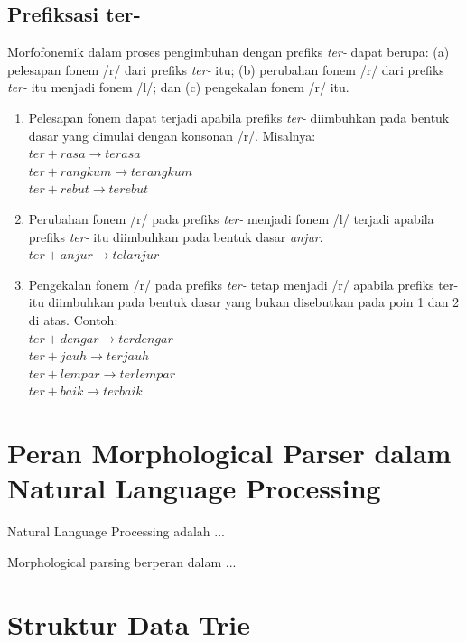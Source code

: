 \subsection{Prefiksasi ter-}
\label{sec:prefiksasiTer-}

Morfofonemik dalam proses pengimbuhan dengan prefiks \textit{ter-} dapat berupa: (a) pelesapan fonem /r/ dari prefiks \textit{ter-} itu; (b) perubahan fonem /r/ dari prefiks \textit{ter-} itu menjadi fonem /l/; dan (c) pengekalan fonem /r/ itu. 

\begin{enumerate}
	\item Pelesapan fonem dapat terjadi apabila prefiks \textit{ter-} diimbuhkan pada bentuk dasar yang dimulai dengan konsonan /r/. Misalnya:\\
	$ter + rasa \rightarrow terasa$\\
	$ter + rangkum \rightarrow terangkum$\\
	$ter + rebut \rightarrow terebut$
	
	\item Perubahan fonem /r/ pada prefiks \textit{ter-} menjadi fonem /l/ terjadi apabila prefiks \textit{ter-} itu diimbuhkan pada bentuk dasar \textit{anjur}.\\
	$ter + anjur \rightarrow telanjur$
	
	\item Pengekalan fonem /r/ pada prefiks \textit{ter-} tetap menjadi /r/ apabila prefiks ter- itu diimbuhkan pada bentuk dasar yang bukan disebutkan pada poin 1 dan 2 di atas. Contoh:\\
	$ter + dengar \rightarrow terdengar$\\	
	$ter + jauh \rightarrow terjauh$\\
	$ter + lempar \rightarrow terlempar$\\
	$ter + baik \rightarrow terbaik$
	
\end{enumerate}


\section{Peran Morphological Parser dalam Natural Language Processing}
\label{sec:peranParser}

Natural Language Processing adalah ...

Morphological parsing berperan dalam ...


\section{Struktur Data Trie}
\label{sec:trie}

